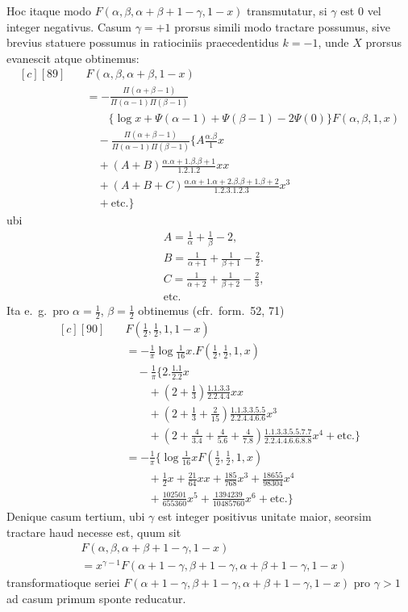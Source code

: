 Hoc itaque modo $F(\alpha,\beta,\alpha+\beta+1-\gamma,1-x)$ transmutatur, si $\gamma$ est $0$
vel integer negativus. Casum $\gamma=+1$ prorsus simili modo tractare possumus,
sive brevius statuere possumus in ratiociniis praecedentidus $k=-1$, unde $X$
prorsus evanescit atque obtinemus:
\[
\begin{aligned}[c]
[89]\quad &F(\alpha,\beta,\alpha+\beta,1-x)\\
&=-\frac{\Pi(\alpha+\beta-1)}{\Pi(\alpha-1)\Pi(\beta-1)}
\\&\qquad\{\log x+\Psi(\alpha-1)+\Psi(\beta-1)-2\Psi(0)\}F(\alpha,\beta,1,x)\\
&\quad-\frac{\Pi(\alpha+\beta-1)}{\Pi(\alpha-1)\Pi(\beta-1)}
\{A\frac{\alpha.\beta}{1}x\\
&\quad+(A+B)\frac{\alpha.\alpha+1.\beta.\beta+1}{1.2.1.2}xx\\
&\quad+(A+B+C)\frac{\alpha.\alpha+1.\alpha+2.\beta.\beta+1.\beta+2}{1.2.3.1.2.3}x^3\\
&\quad+\text{etc.}\}
\end{aligned}
\]
ubi
\[
\begin{aligned}&A=\frac1\alpha+\frac1\beta-2,\\&
B=\frac1{\alpha+1}+\frac1{\beta+1}-\frac22.\\&
C=\frac1{\alpha+2}+\frac1{\beta+2}-\frac23,\\&\text{etc.}\end{aligned}
\]
Ita e.\ g.\ pro $\alpha=\frac12$, $\beta=\frac12$ obtinemus (cfr.\ form.\ 52, 71)
\[
\begin{aligned}[c]
[90]\quad &F(\tfrac12,\tfrac12,1,1-x)\\
&=-\frac1\pi\log\tfrac1{16}x. F(\tfrac12,\tfrac12,1,x)\\
&\quad-\frac1\pi\{2.\frac{1.1}{2.2}x
\\&\qquad+(2+\tfrac13)\frac{1.1.3.3}{2.2.4.4}xx
\\&\qquad+(2+\tfrac13+\tfrac2{15})\frac{1.1.3.3.5.5}{2.2.4.4.6.6}x^3\\
&\qquad+(2+\tfrac4{3.4}+\tfrac4{5.6}+\tfrac4{7.8})
\frac{1.1.3.3.5.5.7.7}{2.2.4.4.6.6.8.8}x^4+\text{etc.}\}\\
&=-\frac1\pi\{\log\tfrac1{16}xF(\tfrac12,\tfrac12,1,x)
\\&\qquad+\tfrac12x+\tfrac{21}{64}xx+\tfrac{185}{768}x^3+\tfrac{18655}{98304}x^4\\
&\qquad+\tfrac{102501}{655360}x^5+\tfrac{1394239}{10485760}x^6+\text{etc.}\}
\end{aligned}
\]
Denique casum tertium, ubi $\gamma$ est integer positivus unitate maior, seorsim
tractare haud necesse est, quum sit
\[
\begin{aligned}&F(\alpha,\beta,\alpha+\beta+1-\gamma,1-x)\\&=x^{\gamma-1}F(\alpha+1-\gamma,\beta+1-\gamma,\alpha+\beta+1-\gamma,1-x)\end{aligned}
\]
transformatioque seriei $F(\alpha+1-\gamma,\beta+1-\gamma,\alpha+\beta+1-\gamma,1-x)$ pro $\gamma>1$
ad casum primum sponte reducatur.

